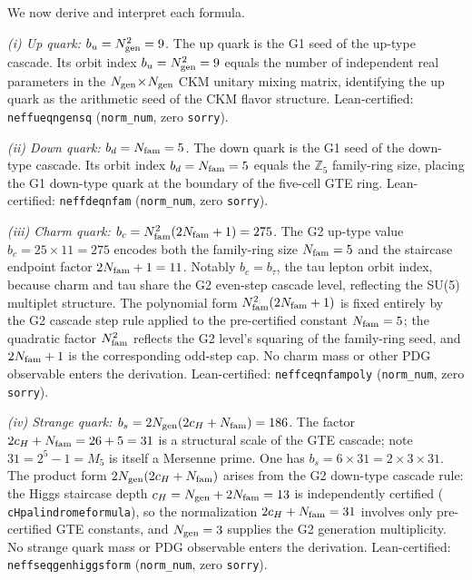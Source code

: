 \documentclass[11pt]{article}
\theoremstyle{remark}
\newcommand{\Ngen}{N_{\rm gen}}
\newcommand{\Nfam}{N_{\rm fam}}
\newcommand{\cH}{c_H}
\newcommand{\lean}[1]{%
  \penalty-100
  \begingroup\def\_{\textunderscore\allowbreak}\texttt{#1}\endgroup}
\newcommand{\bu}{b_u}
\newcommand{\bd}{b_d}
\newcommand{\bc}{b_c}
\newcommand{\bs}{b_s}
\begin{document}
We now derive and interpret each formula.

\medskip

\noindent\textit{(i) Up quark: $\bu = \Ngen^2 = 9$.}\quad
The up quark is the G1 seed of the up-type cascade.
Its orbit index $\bu = \Ngen^2 = 9$ equals the number of independent real parameters
in the $\Ngen\!\times\!\Ngen$ CKM unitary mixing matrix, identifying the up quark as
the arithmetic seed of the CKM flavor structure.
Lean-certified: \lean{neff\_u\_eq\_ngen\_sq} (\texttt{norm\_num}, zero \texttt{sorry}).

\medskip

\noindent\textit{(ii) Down quark: $\bd = \Nfam = 5$.}\quad
The down quark is the G1 seed of the down-type cascade.
Its orbit index $\bd = \Nfam = 5$ equals the $\mathbb{Z}_5$ family-ring size, placing
the G1 down-type quark at the boundary of the five-cell GTE ring.
Lean-certified: \lean{neff\_d\_eq\_nfam} (\texttt{norm\_num}, zero \texttt{sorry}).

\medskip

\noindent\textit{(iii) Charm quark: $\bc = \Nfam^2(2\Nfam+1) = 275$.}\quad
The G2 up-type value $\bc = 25\times 11 = 275$ encodes both the family-ring size
$\Nfam = 5$ and the staircase endpoint factor $2\Nfam+1 = 11$.
Notably $\bc = b_\tau$, the tau lepton orbit index, because charm and tau share the G2
even-step cascade level, reflecting the SU(5) multiplet structure.
The polynomial form $\Nfam^2(2\Nfam+1)$ is fixed entirely by the G2 cascade step rule
applied to the pre-certified constant $\Nfam = 5$; the quadratic factor $\Nfam^2$
reflects the G2 level's squaring of the family-ring seed, and $2\Nfam+1$ is the
corresponding odd-step cap.
No charm mass or other PDG observable enters the derivation.
Lean-certified: \lean{neff\_c\_eq\_nfam\_poly} (\texttt{norm\_num}, zero \texttt{sorry}).

\medskip

\noindent\textit{(iv) Strange quark: $\bs = 2\Ngen(2\cH+\Nfam) = 186$.}\quad
The factor $2\cH+\Nfam = 26+5 = 31$ is a structural scale of the GTE cascade;
note $31 = 2^5 - 1 = M_5$ is itself a Mersenne prime.
One has $\bs = 6\times 31 = 2\times 3\times 31$.
The product form $2\Ngen(2\cH+\Nfam)$ arises from the G2 down-type cascade rule:
the Higgs staircase depth $\cH = \Ngen + 2\Nfam = 13$ is independently certified
(\lean{cH\_palindrome\_formula}), so the normalization $2\cH+\Nfam = 31$ involves only
pre-certified GTE constants, and $\Ngen = 3$ supplies the G2 generation multiplicity.
No strange quark mass or PDG observable enters the derivation.
Lean-certified: \lean{neff\_s\_eq\_gen\_higgs\_form} (\texttt{norm\_num}, zero \texttt{sorry}).
\end{document}
